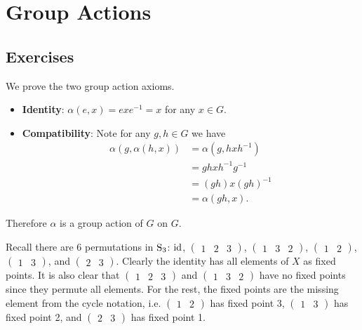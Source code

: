 \section{Group Actions}
\subsection*{Exercises}
\begin{questions}
    \item We prove the two group action axioms.
    \begin{itemize}
        \item \textbf{Identity}: $\alpha(e, x) = exe^{-1} = x$ for any $x \in G$.
        \item \textbf{Compatibility}: Note for any $g, h \in G$ we have
        \begin{align*}
            \alpha(g, \alpha(h, x)) &= \alpha(g, hxh^{-1})\\
            &= gh x h^{-1}g^{-1}\\
            &= (gh)x(gh)^{-1}\\
            &= \alpha(gh, x).
        \end{align*}
    \end{itemize}
    Therefore $\alpha$ is a group action of $G$ on $G$.

    \item Recall there are 6 permutations in $\mathrm{S}_{3}$: $\mathrm{id}$, $\begin{pmatrix}1 & 2 & 3\end{pmatrix}$, $\begin{pmatrix}1 & 3 & 2\end{pmatrix}$, $\begin{pmatrix}1 & 2\end{pmatrix}$, $\begin{pmatrix}1 & 3\end{pmatrix}$, and $\begin{pmatrix}2 & 3\end{pmatrix}$. Clearly the identity has all elements of $X$ as fixed points. It is also clear that $\begin{pmatrix}1 & 2 & 3\end{pmatrix}$ and $\begin{pmatrix}1 & 3 & 2\end{pmatrix}$ have no fixed points since they permute all elements. For the rest, the fixed points are the missing element from the cycle notation, i.e. $\begin{pmatrix}1 & 2\end{pmatrix}$ has fixed point 3, $\begin{pmatrix}1 & 3\end{pmatrix}$ has fixed point 2, and $\begin{pmatrix}2 & 3\end{pmatrix}$ has fixed point 1.


\end{questions}
